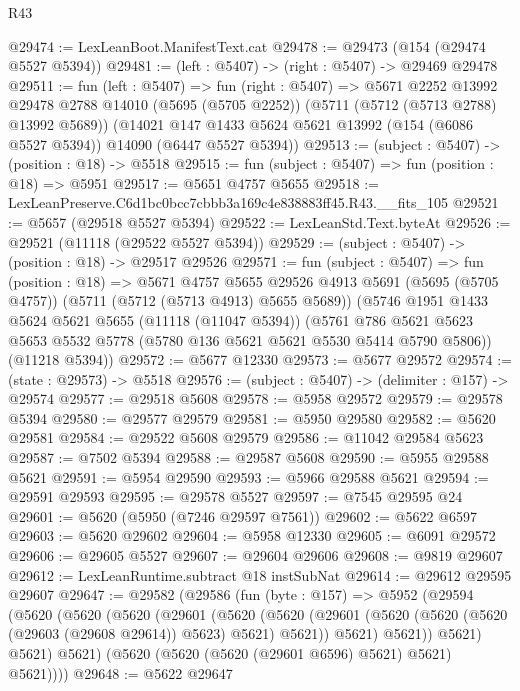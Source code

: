 \begin{lexlean}{R43}
\begin{coremodule}
@29474 := LexLeanBoot.ManifestText.cat
@29478 := @29473 (@154 (@29474 @5527 @5394))
@29481 := (left : @5407) -> (right : @5407) -> @29469 @29478
@29511 := fun (left : @5407) =>
  fun (right : @5407) =>
  @5671
    @2252
    @13992
    @29478
    @2788
    @14010
    (@5695 (@5705 @2252))
    (@5711 (@5712 (@5713 @2788) @13992 @5689))
    (@14021 @147 @1433 @5624 @5621 @13992 (@154 (@6086 @5527 @5394)) @14090 (@6447 @5527 @5394))
@29513 := (subject : @5407) -> (position : @18) -> @5518
@29515 := fun (subject : @5407) => fun (position : @18) => @5951
@29517 := @5651 @4757 @5655
@29518 := LexLeanPreserve.C6d1bc0bcc7cbbb3a169c4e838883ff45.R43.__fits_105
@29521 := @5657 (@29518 @5527 @5394)
@29522 := LexLeanStd.Text.byteAt
@29526 := @29521 (@11118 (@29522 @5527 @5394))
@29529 := (subject : @5407) -> (position : @18) -> @29517 @29526
@29571 := fun (subject : @5407) =>
  fun (position : @18) =>
  @5671
    @4757
    @5655
    @29526
    @4913
    @5691
    (@5695 (@5705 @4757))
    (@5711 (@5712 (@5713 @4913) @5655 @5689))
    (@5746
      @1951
      @1433
      @5624
      @5621
      @5655
      (@11118 (@11047 @5394))
      (@5761 @786 @5621 @5623 @5653 @5532 @5778 (@5780 @136 @5621 @5621 @5530 @5414 @5790 @5806))
      (@11218 @5394))
@29572 := @5677 @12330
@29573 := @5677 @29572
@29574 := (state : @29573) -> @5518
@29576 := (subject : @5407) -> (delimiter : @157) -> @29574
@29577 := @29518 @5608
@29578 := @5958 @29572
@29579 := @29578 @5394
@29580 := @29577 @29579
@29581 := @5950 @29580
@29582 := @5620 @29581
@29584 := @29522 @5608 @29579
@29586 := @11042 @29584 @5623
@29587 := @7502 @5394
@29588 := @29587 @5608
@29590 := @5955 @29588 @5621
@29591 := @5954 @29590
@29593 := @5966 @29588 @5621
@29594 := @29591 @29593
@29595 := @29578 @5527
@29597 := @7545 @29595 @24
@29601 := @5620 (@5950 (@7246 @29597 @7561))
@29602 := @5622 @6597
@29603 := @5620 @29602
@29604 := @5958 @12330
@29605 := @6091 @29572
@29606 := @29605 @5527
@29607 := @29604 @29606
@29608 := @9819 @29607
@29612 := LexLeanRuntime.subtract @18 instSubNat
@29614 := @29612 @29595 @29607
@29647 := @29582
    (@29586
      (fun (byte : @157) =>
      @5952
        (@29594
          (@5620
            (@5620
              (@5620
                (@29601
                  (@5620
                    (@5620
                      (@29601 (@5620 (@5620 (@5620 (@29603 (@29608 @29614)) @5623) @5621) @5621))
                      @5621)
                    @5621))
                @5621)
              @5621)
            @5621)
          (@5620 (@5620 (@5620 (@29601 @6596) @5621) @5621) @5621))))
@29648 := @5622 @29647

\end{coremodule}
\end{lexlean}
